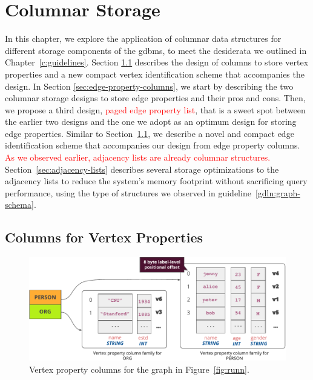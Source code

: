 \chapter{Columnar Storage}
\label{c:columnar-storage}

In this chapter, we explore the application of columnar data structures for different storage components of the \gls{gdbms}, to meet the desiderata we outlined in Chapter~\ref{c:guidelines}. Section \ref{sec:vertex-property-columns} describes the design of columns to store vertex properties and a new compact vertex identification scheme that accompanies the design. In Section \ref{sec:edge-property-columns}, we start by describing the two columnar storage designs to store edge properties and their pros and cons. Then, we propose a third design, \textcolor{red}{paged edge property list}, that is a sweet spot between the earlier two designs and the one we adopt as an optimum design for storing edge properties. Similar to Section~\ref{sec:vertex-property-columns}, we describe a novel and compact edge identification scheme that accompanies our design from edge property columns. \textcolor{red}{As we observed earlier, adjacency lists are already columnar structures.} Section~\ref{sec:adjacency-lists} describes several storage optimizations to the adjacency lists to reduce the system's memory footprint without sacrificing query performance, using the type of structures we observed in guideline~\ref{gdln:graph-schema}.

\section{Columns for Vertex Properties}
\label{sec:vertex-property-columns}

\begin{figure}
	\vspace{-25pt}
	\hfill\includegraphics[scale=0.85]{img/vpcols}\hspace*{\fill}
	\caption{Vertex property columns for the graph in Figure~\ref{fig:runn}.}
	\label{fig:vpcols}
	\vspace{-8pt}
\end{figure}

